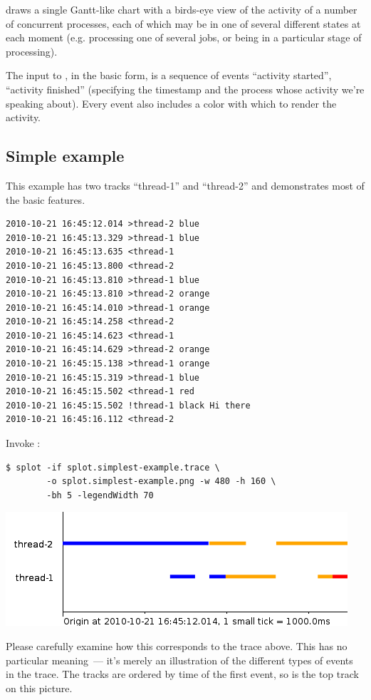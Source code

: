 \documentclass{article}
\begin{document}
\splot{} draws a single Gantt-like chart with a birds-eye view of the activity of a number of concurrent processes, each of which may be in one of several different states at each moment (e.g. processing one of several jobs, or being in a particular stage of processing). 

The input to \splot{}, in the basic form, is a sequence of events ``activity started'', ``activity finished'' (specifying the timestamp and the process whose activity we're speaking about). Every event also includes a color with which to render the activity.

\subsection{Simple example}

This example has two tracks ``thread-1'' and ``thread-2'' and demonstrates most of the basic features.

\begin{verbatim}
2010-10-21 16:45:12.014 >thread-2 blue
2010-10-21 16:45:13.329 >thread-1 blue
2010-10-21 16:45:13.635 <thread-1
2010-10-21 16:45:13.800 <thread-2
2010-10-21 16:45:13.810 >thread-1 blue
2010-10-21 16:45:13.810 >thread-2 orange
2010-10-21 16:45:14.010 >thread-1 orange
2010-10-21 16:45:14.258 <thread-2
2010-10-21 16:45:14.623 <thread-1
2010-10-21 16:45:14.629 >thread-2 orange
2010-10-21 16:45:15.138 >thread-1 orange
2010-10-21 16:45:15.319 >thread-1 blue
2010-10-21 16:45:15.502 <thread-1 red
2010-10-21 16:45:15.502 !thread-1 black Hi there
2010-10-21 16:45:16.112 <thread-2
\end{verbatim}

Invoke \splot{}:
\begin{verbatim}
$ splot -if splot.simplest-example.trace \
        -o splot.simplest-example.png -w 480 -h 160 \
        -bh 5 -legendWidth 70
\end{verbatim}

{\center\includegraphics[scale=0.5]{pics/splot/splot-simplest-example.png} }

Please carefully examine how this corresponds to the trace above. This has no particular meaning~--- it's merely an illustration of the different types of events in the trace. The tracks are ordered by time of the first event, so  is the top track on this picture.
\end{document}
